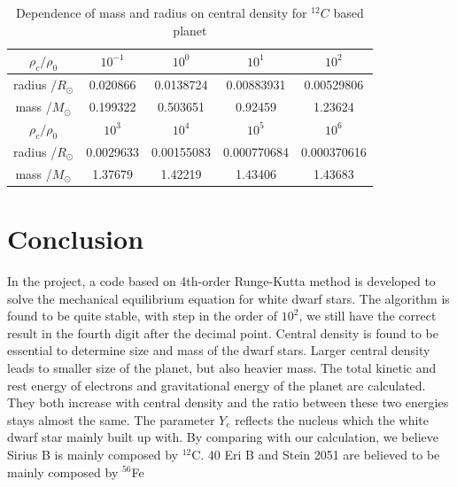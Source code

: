 \documentclass{article}
\begin{document}
\begin{table}[H]
\centering
\begin{tabular}{|c|c|c|c|c|}
\hline
$\rho_c /\rho_0$& $10^{-1}$& $10^{0}$ & $10^{1}$  & $10^{2}$  \\
\hline
radius /$R_{\odot}$& 0.020866&  0.0138724&   0.00883931&  0.00529806\\
\hline
mass /$M_{\odot}$& 0.199322&  0.503651&  0.92459&  1.23624\\
\hline
$\rho_c /\rho_0$&  $10^{3}$  & $10^{4}$  & $10^{5}$  & $10^{6}$ \\
\hline
radius /$R_{\odot}$& 0.0029633& 0.00155083& 0.000770684 & 0.000370616\\
\hline
mass /$M_{\odot}$&1.37679&  1.42219&  1.43406 &  1.43683\\
\hline
\end{tabular}
\caption{Dependence of mass and radius on central density for $^{12}C$ based planet}
\label{tab:C}
\end{table}

\section{Conclusion}
 In the project, a code based on 4th-order Runge-Kutta method is developed to solve the mechanical equilibrium equation for white dwarf stars. The algorithm is found to be quite stable, with step in the order of $10^2$, we still have the correct result in the fourth digit after the decimal point. Central density is found to be essential to determine size and mass of the dwarf stars. Larger central density leads to smaller size of the planet, but also heavier mass. The total kinetic and rest energy of electrons and gravitational energy of the planet are calculated. They both increase with central density and the ratio between these two energies stays almost the same. The parameter $Y_e$ reflects the nucleus which the white dwarf star mainly built up with. By comparing with our calculation, we believe Sirius B is mainly composed by $^{12}$C. 40 Eri B and Stein 2051 are believed to be mainly composed by $^{56}$Fe





\end{document}
